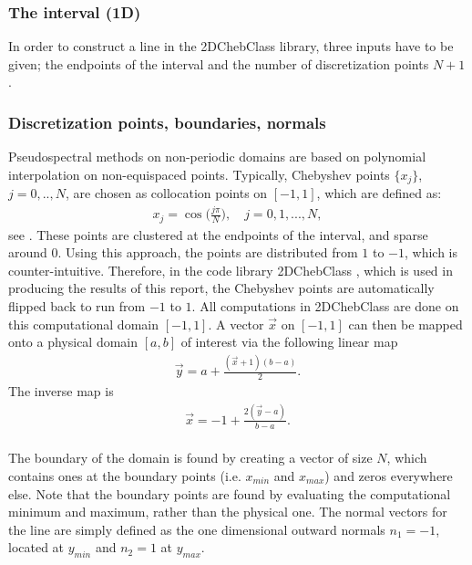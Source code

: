 


\subsubsection{The interval (1D)}
In order to construct a line in the 2DChebClass library, three inputs have to be given; the endpoints of the interval and the number of discretization points $N+1$.
\subsubsection*{Discretization points, boundaries, normals}
Pseudospectral methods on non-periodic domains are based on polynomial interpolation on non-equispaced points.  
Typically, Chebyshev points $\{x_j\}$, $j = 0,..,N$, are chosen as collocation points on $[-1,1]$, which are defined as:
\begin{align}\label{defChebyshevPoints}
	x_j= \cos\bigg(\frac{j \pi}{N}\bigg), \quad j=0,1,...,N,
\end{align}	
see \cite{bibTrefethen}.
These points are clustered at the endpoints of the interval, and sparse around $0$. Using this approach, the points are distributed from $1$ to $-1$, which is counter-intuitive. Therefore, in the code library 2DChebClass \cite{GoddardPseudospectralCode1}, which is used in producing the results of this report, the Chebyshev points are automatically flipped back to run from $-1$ to $1$. All computations in 2DChebClass are done on this computational domain $[-1,1]$. A vector $\vec x$ on $[-1,1]$ can then be mapped onto a physical domain $[a,b]$ of interest via the following linear map
\begin{align}\label{eq:linearmap}
\vec y = a + \frac{(\vec x+1)(b-a)}{2}.  
\end{align}
The inverse map is 
\begin{align}\label{eq:invlinearmap}
\vec x = -1 + \frac{2(\vec y-a)}{b-a}.
\end{align}
\\
The boundary of the domain is found by creating a vector of size $N$, which contains ones at the boundary points (i.e. $x_{min}$ and $x_{max}$) and zeros everywhere else. Note that the boundary points are found by evaluating the computational minimum and maximum, rather than the physical one.
The normal vectors for the line are simply defined as the one dimensional outward normals $n_1 = -1$, located at $y_{min}$ and $n_2 = 1$ at $y_{max}$. 
